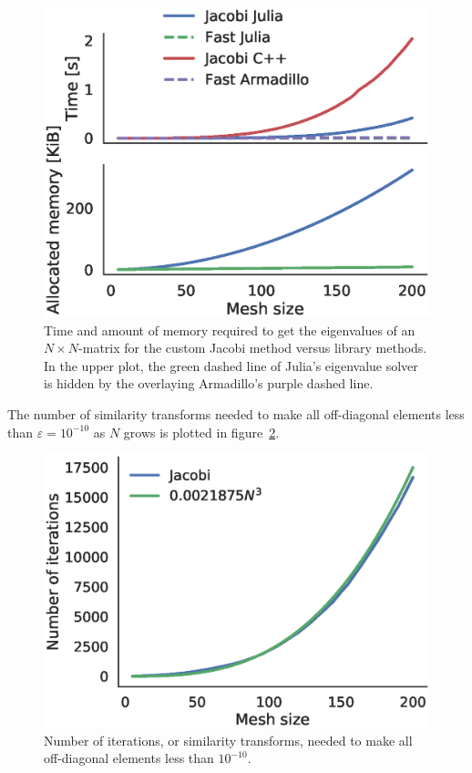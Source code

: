 \documentclass[aps,reprint]{revtex4-1}
\begin{document}
\begin{figure}[ht]
  \centering
  \includegraphics[width=\columnwidth]{figures/juliatime.eps}
  \caption{\label{fig:juliatiming} Time and amount of memory required to get the eigenvalues of an
    \(N\times N\)-matrix for the custom Jacobi method versus library methods. In
  the upper plot, the green dashed line of Julia's eigenvalue solver is hidden
  by the overlaying Armadillo's purple dashed line.}
\end{figure}

The number of similarity transforms needed to make all off-diagonal elements
less than \(\varepsilon=10^{-10}\) as \(N\) grows is plotted in
figure~\ref{fig:juliaiterations}.

\begin{figure}[ht]
  \centering
  \includegraphics[width=\columnwidth]{figures/iterations.eps}
  \caption{\label{fig:juliaiterations} Number of iterations, or similarity
    transforms, needed to make all off-diagonal elements less than \(10^{-10}\).}
\end{figure}
\end{document}
